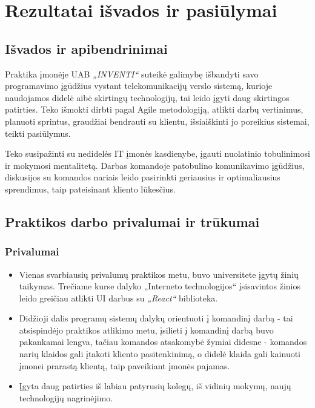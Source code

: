 \section{Rezultatai išvados ir pasiūlymai}

\subsection{Išvados ir apibendrinimai}

Praktika įmonėje UAB \textit{„INVENTI“} suteikė galimybę išbandyti savo programavimo įgūdžius vystant telekomunikacijų verslo sistemą,
kurioje naudojamos didelė aibė skirtingų technologijų, tai leido įgyti daug skirtingos patirties. Teko išmokti dirbti pagal Agile metodologiją,
atlikti darbų vertinimus, planuoti sprintus, graudžiai bendrauti su klientu, išsiaiškinti jo poreikius sistemai, teikti pasiūlymus.

Teko susipažinti su nedidelės IT įmonės kasdienybe, įgauti nuolatinio tobulinimosi ir mokymosi mentalitetą. Darbas komandoje patobulino komunikavimo įgūdžius,
diskusijos su komandos nariais leido pasirinkti geriausius ir optimaliausius sprendimus, taip pateisinant kliento lūkesčius.

\subsection{Praktikos darbo privalumai ir trūkumai}

\subsubsection{Privalumai}

\begin{itemize}
    \item Vienas svarbiausių privalumų praktikos metu, buvo universitete įgytų žinių taikymas. Trečiame kurse dalyko „Interneto technologijos“ įsisavintos žinios leido greičiau
    atlikti UI darbus su \textit{„React“} biblioteka.
    \item Didžioji dalis programų sistemų dalykų orientuoti į komandinį darbą - tai atsispindėjo praktikos atlikimo metu, įsilieti į komandinį darbą buvo pakankamai lengva,
    tačiau komandos atsakomybė žymiai didesne - komandos narių klaidos gali įtakoti kliento pasitenkinimą, o didelė klaida gali kainuoti įmonei prarastą klientą, taip paveikiant
    įmonės pajamas.
    \item Įgyta daug patirties iš labiau patyrusių kolegų, iš vidinių mokymų, naujų technologijų nagrinėjimo.
\end{itemize}

